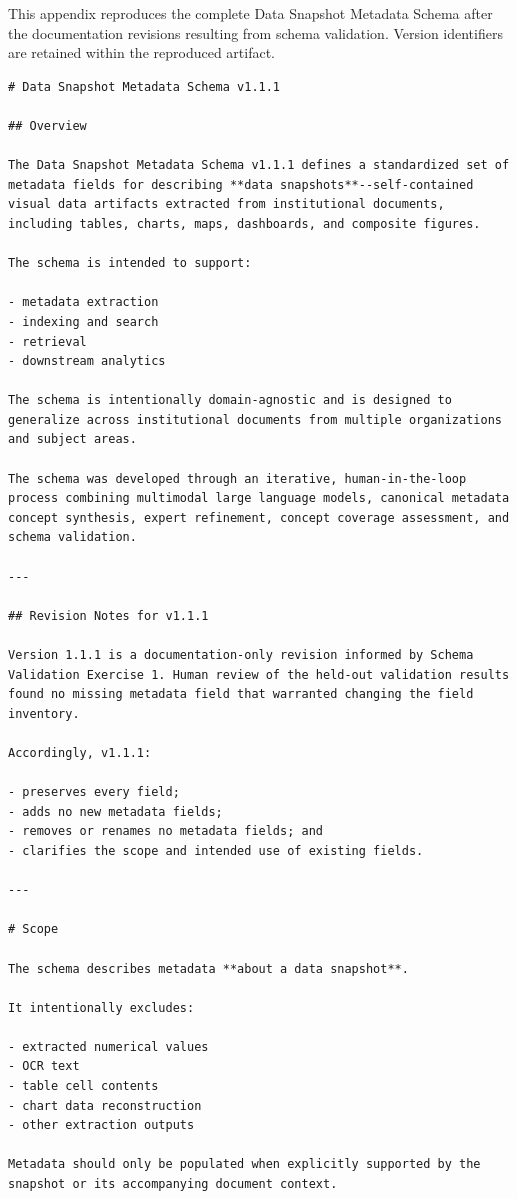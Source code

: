 \documentclass{article}
\begin{document}
This appendix reproduces the complete Data Snapshot Metadata Schema after the documentation revisions resulting from schema validation. Version identifiers are retained within the reproduced artifact.

\begin{lstlisting}
# Data Snapshot Metadata Schema v1.1.1

## Overview

The Data Snapshot Metadata Schema v1.1.1 defines a standardized set of metadata fields for describing **data snapshots**--self-contained visual data artifacts extracted from institutional documents, including tables, charts, maps, dashboards, and composite figures.

The schema is intended to support:

- metadata extraction
- indexing and search
- retrieval
- downstream analytics

The schema is intentionally domain-agnostic and is designed to generalize across institutional documents from multiple organizations and subject areas.

The schema was developed through an iterative, human-in-the-loop process combining multimodal large language models, canonical metadata concept synthesis, expert refinement, concept coverage assessment, and schema validation.

---

## Revision Notes for v1.1.1

Version 1.1.1 is a documentation-only revision informed by Schema Validation Exercise 1. Human review of the held-out validation results found no missing metadata field that warranted changing the field inventory.

Accordingly, v1.1.1:

- preserves every field;
- adds no new metadata fields;
- removes or renames no metadata fields; and
- clarifies the scope and intended use of existing fields.

---

# Scope

The schema describes metadata **about a data snapshot**.

It intentionally excludes:

- extracted numerical values
- OCR text
- table cell contents
- chart data reconstruction
- other extraction outputs

Metadata should only be populated when explicitly supported by the snapshot or its accompanying document context.


\end{lstlisting}
\end{document}
